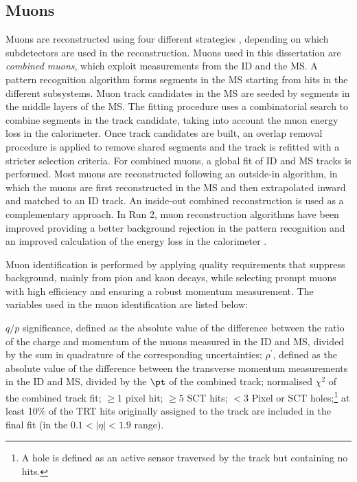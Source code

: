 \subsection{Muons}
\label{chp:obj:sec:muon}
Muons are reconstructed using four different strategies \cite{Aad:2016jkr}, depending on which subdetectors are used in the reconstruction. Muons used in this dissertation are \emph{combined muons}, which exploit measurements from the ID and the MS. A pattern recognition algorithm forms segments in the MS starting from hits in the different subsystems. Muon track candidates in the MS are seeded by segments in the middle layers of the MS. The fitting procedure uses a combinatorial search to combine segments in the track candidate, taking into account the muon energy loss in the calorimeter. Once track candidates are built, an overlap removal procedure is applied to remove shared segments and the track is refitted with a stricter selection criteria. For combined muons, a global fit of ID and MS tracks is performed. Most muons are reconstructed following an outside-in algorithm, in which the muons are first reconstructed in the MS and then extrapolated inward and matched to an ID track. An inside-out combined reconstruction is used as a complementary approach. In Run 2, muon reconstruction algorithms have been improved providing a better background rejection in the pattern recognition and an improved calculation of the energy loss in the calorimeter \cite{Aad:2016jkr}.\par
Muon  identification  is performed  by  applying  quality  requirements  that  suppress  background,  mainly from pion and kaon decays, while selecting prompt muons with high efficiency and ensuring a robust momentum measurement. The variables used in the muon identification are listed below:

\bi
\ib $q/p$ significance, defined as the absolute value of the difference between the ratio of the charge and momentum of the muons measured in the ID and MS, divided by the sum in quadrature of the corresponding uncertainties;
\ib $\rho^{\prime}$, defined as the absolute value of the difference between the transverse momentum measurements in the ID and MS, divided by the $\pt$ of the combined track;
\ib normalised $\chi^{2}$ of the combined track fit;
\ib $\ge 1$ pixel hit;
\ib $\ge 5$ SCT hits;
\ib $<3$ Pixel or SCT holes;\footnote{A hole is defined as an active sensor traversed by the track but containing no hits.}
\ib at least 10$\%$ of the TRT hits originally assigned to the track are included in the final fit (in the $0.1< |\eta| <1.9$ range).
\ei

